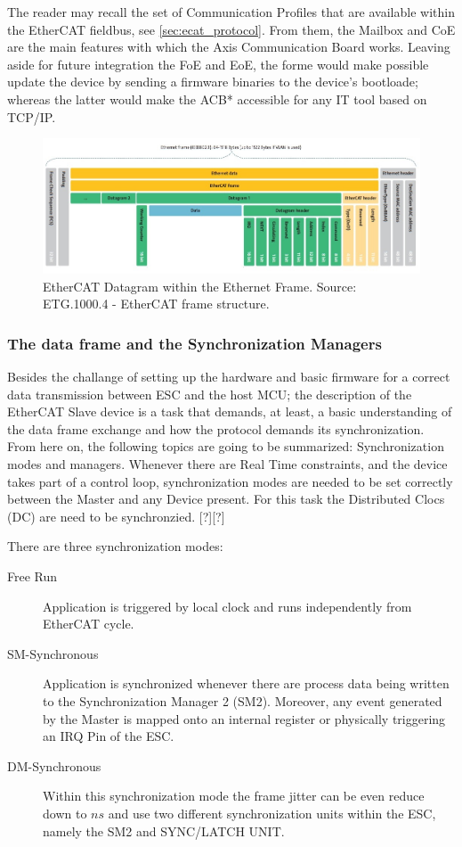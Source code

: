 The reader may recall the set of Communication Profiles that are available within the EtherCAT fieldbus, see \ref{sec:ecat_protocol}. From them, the Mailbox and CoE 
are the main features with which the Axis Communication Board works. Leaving aside for future integration the FoE and EoE, the forme would make possible 
update the device by sending a firmware binaries to the device's bootloade; whereas the latter would make the ACB* accessible for any IT tool based on TCP/IP.

\begin{figure}[ht]
    \centering
    \includegraphics[width=\textwidth]{imgs/impl-dataframe.jpg}
    \caption{EtherCAT Datagram within the Ethernet Frame. Source: ETG.1000.4 - EtherCAT frame structure.}
    \label{fig:dataframe}
\end{figure}

\subsubsection{The data frame and the Synchronization Managers}
Besides the challange of setting up the hardware and basic firmware for a correct data transmission between ESC and the host MCU; the description of the EtherCAT 
Slave device is a task that demands, at least, a basic understanding of the data frame exchange and how the protocol demands its synchronization. From here on, the following
topics are going to be summarized: Synchronization modes and managers.
Whenever there are Real Time constraints, and the device takes part of a control loop, synchronization modes are needed to be set correctly between the Master and
any Device present. For this task the Distributed Clocs (DC) are need to be synchronzied. [?][?] %

There are three synchronization modes:  
\begin{description}
    \item[Free Run] Application is triggered by local clock and runs independently from EtherCAT cycle. 
    \item[SM-Synchronous] Application is synchronized whenever there are process data being written to the Synchronization Manager 2 (SM2).
    Moreover, any event generated by the Master is mapped onto an internal register or physically triggering an IRQ Pin of the ESC. 
    \item[DM-Synchronous] Within this synchronization mode the frame jitter can be even reduce down to $ns$ and use two different synchronization
    units within the ESC, namely the SM2 and SYNC/LATCH UNIT. 
\end{description}

